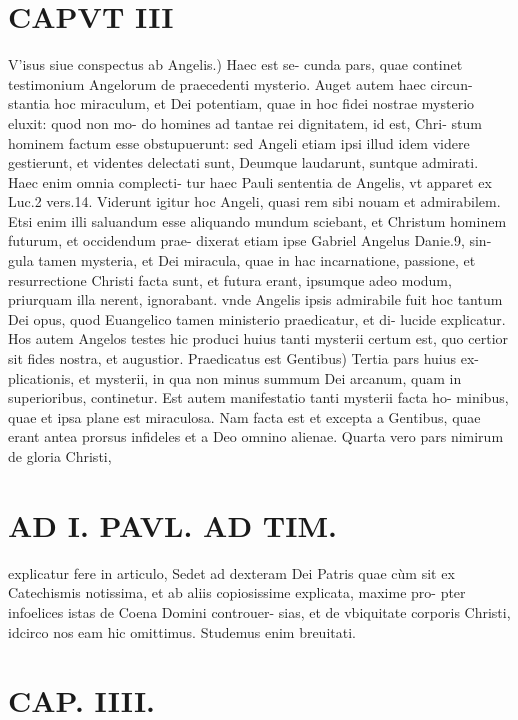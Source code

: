 \documentclass{article}
\begin{document}
\begin{pages}
\section*{CAPVT  III }
\marginpar{[ p.181 ]}\pstart V'isus siue conspectus ab Angelis.) Haec est se- cunda pars, quae continet testimonium Angelorum de praecedenti mysterio. Auget autem haec circun- stantia hoc miraculum, et Dei potentiam, quae in hoc fidei nostrae mysterio eluxit: quod non mo- do homines ad tantae rei dignitatem, id est, Chri- stum hominem factum esse obstupuerunt: sed Angeli etiam ipsi illud idem videre gestierunt, et videntes delectati sunt, Deumque laudarunt, suntque admirati. Haec enim omnia complecti- tur haec Pauli sententia de Angelis, vt apparet ex Luc.2 vers.14. Viderunt igitur hoc Angeli, quasi rem sibi nouam et admirabilem. Etsi enim illi saluandum esse aliquando mundum sciebant, et Christum hominem futurum, et occidendum prae- dixerat etiam ipse Gabriel Angelus Danie.9, sin- gula tamen mysteria, et Dei miracula, quae in hac incarnatione, passione, et resurrectione Christi facta sunt, et futura erant, ipsumque adeo modum, priurquam illa nerent, ignorabant. vnde Angelis ipsis admirabile fuit hoc tantum Dei opus, quod Euangelico tamen ministerio praedicatur, et di- lucide explicatur. Hos autem Angelos testes hic produci huius tanti mysterii certum est, quo certior sit fides nostra, et augustior.  \pend\pstart Praedicatus est Gentibus) Tertia pars huius ex- plicationis, et mysterii, in qua non minus summum Dei arcanum, quam in superioribus, continetur. Est autem manifestatio tanti mysterii facta ho- minibus, quae et ipsa plane est miraculosa. Nam facta est et excepta a Gentibus, quae erant antea prorsus infideles et a Deo omnino alienae.  \pend\pstart Quarta vero pars nimirum de gloria Christi,  \pend
\section*{AD I. PAVL. AD TIM. }
\marginpar{[ p.180 ]}\pstart explicatur fere in articulo, Sedet ad dexteram Dei Patris quae cùm sit ex Catechismis notissima, et ab aliis copiosissime explicata, maxime pro- pter infoelices istas de Coena Domini controuer- sias, et de vbiquitate corporis Christi, idcirco nos eam hic omittimus. Studemus enim breuitati.  \pend
\endnumbering\beginnumbering\section{CAP. IIII.}
{}

\end{pages}
\end{document}
